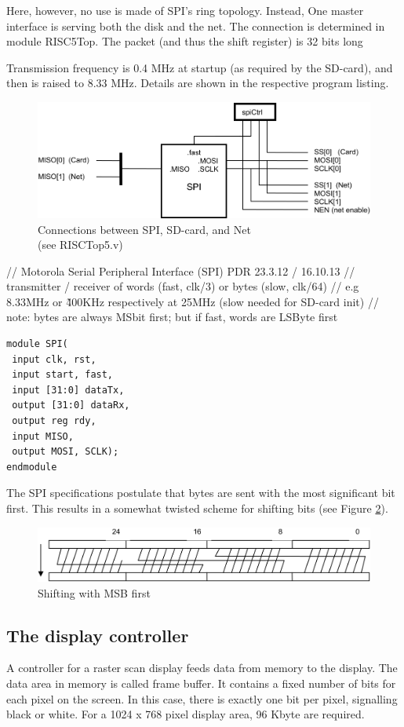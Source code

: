Here, however, no use is made of SPI's ring topology. Instead, One master interface is serving both the disk
and the net. The connection is determined in module RISC5Top. The packet (and thus the shift register)
is 32 bits long

Transmission frequency is 0.4 MHz at startup (as required by the SD-card), and then is raised to
8.33 MHz. Details are shown in the respective program listing.
\begin{figure}[h!]
  \centering
  \includegraphics[width=\textwidth]{i/G/7.png}
  \caption{Connections between SPI, SD-card, and Net\\(see RISCTop5.v)}
  \label{fig:spi}
\end{figure}

// Motorola Serial Peripheral Interface (SPI) PDR 23.3.12 / 16.10.13
// transmitter / receiver of words (fast, clk/3) or bytes (slow, clk/64)
// e.g 8.33MHz or \~400KHz respectively at 25MHz (slow needed for SD-card init)
// note: bytes are always MSbit first; but if fast, words are LSByte first
\begin{verbatim}
module SPI(
 input clk, rst,
 input start, fast,
 input [31:0] dataTx,
 output [31:0] dataRx,
 output reg rdy,
 input MISO,
 output MOSI, SCLK);
endmodule
\end{verbatim}

The SPI specifications postulate that bytes are sent with the most significant bit first. This results in
a somewhat twisted scheme for shifting bits (see Figure \ref{fig:msb}).
\begin{figure}[h!]
  \centering
  \includegraphics[width=\textwidth]{i/G/8.png}
  \caption{Shifting with MSB first}
  \label{fig:msb}
\end{figure}

\subsection{The display controller}
A controller for a raster scan display feeds data from memory to the display. The data area in
memory is called frame buffer. It contains a fixed number of bits for each pixel on the screen. In this
case, there is exactly one bit per pixel, signalling black or white. For a 1024 x 768 pixel display
area, 96 Kbyte are required.

